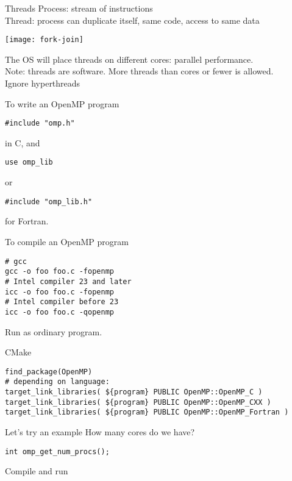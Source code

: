 \begin{numberedframe}{Threads}
  Process: stream of instructions\\
  Thread: process can duplicate itself, same code, access to same data

  \texttt{[image: fork-join]}

  The OS will place threads on different cores: parallel
  performance.\\
  Note: threads are software. More threads than cores or fewer is allowed.\\
  Ignore hyperthreads
\end{numberedframe}

\begin{numberedframe}{To write an OpenMP program}
\begin{lstlisting}
#include "omp.h"
\end{lstlisting}
in C, and 
\begin{lstlisting}
use omp_lib
\end{lstlisting}
or
\begin{lstlisting}
#include "omp_lib.h"
\end{lstlisting}
for Fortran.  
\end{numberedframe}

\begin{numberedframe}{To compile an OpenMP program}
\begin{verbatim}
# gcc
gcc -o foo foo.c -fopenmp
# Intel compiler 23 and later
icc -o foo foo.c -fopenmp
# Intel compiler before 23 
icc -o foo foo.c -qopenmp
\end{verbatim}
Run as ordinary program.
\end{numberedframe}

\begin{numberedframe}{CMake}
\begin{lstlisting}
find_package(OpenMP)
# depending on language:
target_link_libraries( ${program} PUBLIC OpenMP::OpenMP_C )
target_link_libraries( ${program} PUBLIC OpenMP::OpenMP_CXX )
target_link_libraries( ${program} PUBLIC OpenMP::OpenMP_Fortran )
\end{lstlisting}
\end{numberedframe}

\begin{numberedframe}{Let's try an example}
  How many cores do we have?
\begin{lstlisting}
int omp_get_num_procs();
\end{lstlisting}
Compile and run
\end{numberedframe}

